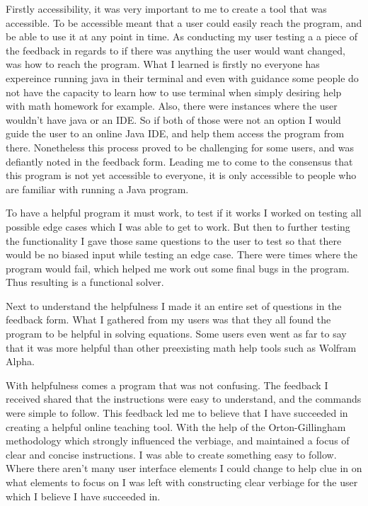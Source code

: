 \documentclass[10pt,twocolumn]{article}
\begin{document}
Firstly accessibility, it was very important to me to create a tool that was accessible. To be accessible meant that a user could easily reach the program, and be able to use it at any point in time. As conducting my user testing a a piece of the feedback in regards to if there was anything the user would want changed, was how to reach the program. What I learned is firstly no everyone has expereince running java in their terminal and even with guidance some people do not have the capacity to learn how to use terminal when simply desiring help with math homework for example. Also, there were instances where the user wouldn't have java or an IDE. So if both of those were not an option I would guide the user to an online Java IDE, and help them access the program from there. Nonetheless this process proved to be challenging for some users, and was defiantly noted in the feedback form. Leading me to come to the consensus that this program is not yet accessible to everyone, it is only accessible to people who are familiar with running a Java program.

To have a helpful program it must work, to test if it works I worked on testing all possible edge cases which I was able to get to work. But then to further testing the functionality I gave those same questions to the user to test so that there would be no biased input while testing an edge case. There were times where the program would fail, which helped me work out some final bugs in the program. Thus resulting is a functional solver.  

Next to understand the helpfulness I made it an entire set of questions in the feedback form. What I gathered from my users was that they all found the program to be helpful in solving equations. Some users even went as far to say that it was more helpful than other preexisting math help tools such as Wolfram Alpha. 

With helpfulness comes a program that was not confusing. The feedback I received shared that the instructions were easy to understand, and the commands were simple to follow. This feedback led me to believe that I have succeeded in creating a helpful online teaching tool. With the help of the Orton-Gillingham methodology which strongly influenced the verbiage, and maintained a focus of clear and concise instructions. I was able to create something easy to follow. Where there aren't many user interface elements I could change to help clue in on what elements to focus on I was left with constructing clear verbiage for the user which I believe I have succeeded in. 
\end{document}
